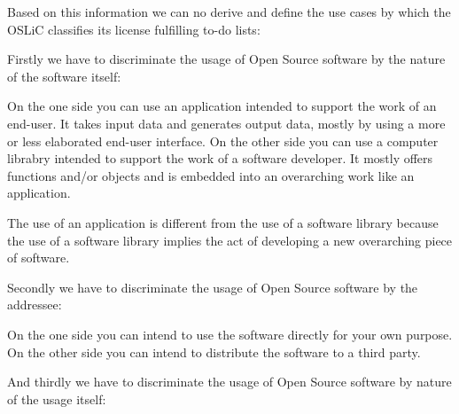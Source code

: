 %
%
%
%
%



Based on this information we can no derive and define the use cases by which the
OSLiC classifies its license fulfilling to-do lists:

Firstly we have to discriminate the usage of Open Source software by the nature
of the software itself:

On the one side you can use an application intended to support the work of an
end-user. It takes input data and generates output data, mostly by using a more
or less elaborated end-user interface. On the other side you can use a computer
librabry intended to support the work of a software developer. It mostly offers
functions and/or objects and is embedded into an overarching work like an
application.

The use of an application is different from the use of a software library
because the use of a software library implies the act of developing a new
overarching piece of software.

Secondly we have to discriminate the usage of Open Source software by the
addressee:

On the one side you can intend to use the software directly for your own
purpose. On the other side you can intend to distribute the software to a third
party.

And thirdly we have to discriminate the usage of Open Source software by nature of
the usage itself:

